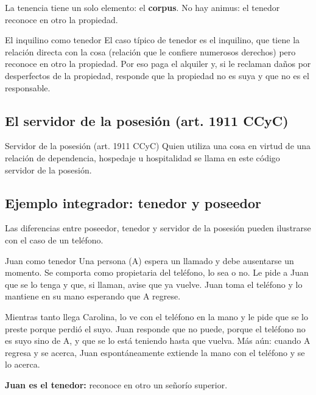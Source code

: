 \documentclass[12pt,oneside]{book}
\begin{document}
La tenencia tiene un solo elemento: el \textbf{corpus}. No hay animus: el tenedor reconoce en otro la propiedad.

\begin{example}{El inquilino como tenedor}
El caso típico de tenedor es el inquilino, que tiene la relación directa con la cosa (relación que le confiere numerosos derechos) pero reconoce en otro la propiedad. Por eso paga el alquiler y, si le reclaman daños por desperfectos de la propiedad, responde que la propiedad no es suya y que no es el responsable.
\end{example}

\subsection{El servidor de la posesión (art. 1911 CCyC)}

\begin{definition}{Servidor de la posesión (art. 1911 CCyC)}
Quien utiliza una cosa en virtud de una relación de dependencia, hospedaje u hospitalidad se llama en este código servidor de la posesión.
\end{definition}

\subsection{Ejemplo integrador: tenedor y poseedor}

Las diferencias entre poseedor, tenedor y servidor de la posesión pueden ilustrarse con el caso de un teléfono.

\begin{example}{Juan como tenedor}
Una persona (A) espera un llamado y debe ausentarse un momento. Se comporta como propietaria del teléfono, lo sea o no. Le pide a Juan que se lo tenga y que, si llaman, avise que ya vuelve. Juan toma el teléfono y lo mantiene en su mano esperando que A regrese.

Mientras tanto llega Carolina, lo ve con el teléfono en la mano y le pide que se lo preste porque perdió el suyo. Juan responde que no puede, porque el teléfono no es suyo sino de A, y que se lo está teniendo hasta que vuelva. Más aún: cuando A regresa y se acerca, Juan espontáneamente extiende la mano con el teléfono y se lo acerca.

\textbf{Juan es el tenedor:} reconoce en otro un señorío superior.
\end{example}
\end{document}
